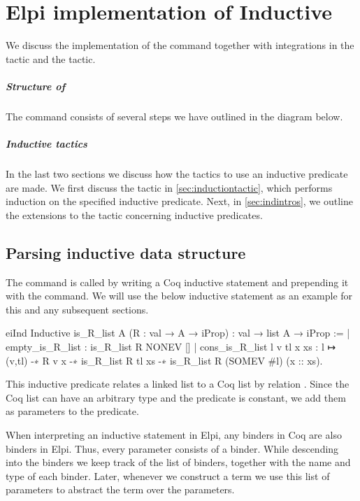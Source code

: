 \documentclass[thesis.tex]{subfiles}
\begin{document}
\chapter{Elpi implementation of Inductive}\label{ch:inductiveimpl}
We discuss the implementation of the  command together with integrations in the  tactic and the  tactic.

\paragraph{Structure of }
The  command consists of several steps we have outlined in the diagram below.

\paragraph{Inductive tactics}
In the last two sections we discuss how the tactics to use an inductive predicate are made. We first discuss the  tactic in \cref{sec:inductiontactic}, which performs induction on the specified inductive predicate. Next, in \cref{sec:indintros}, we outline the extensions to the  tactic concerning inductive predicates.

\section{Parsing inductive data structure}
The  command is called by writing a Coq inductive statement and prepending it with the  command. We will use the below inductive statement as an example for this and any subsequent sections.
\begin{coqcode}
  eiInd
  Inductive is_R_list {A} (R : val → A → iProp) : 
                      val → list A → iProp :=
    | empty_is_R_list : is_R_list R NONEV []
    | cons_is_R_list l v tl x xs : 
        l ↦ (v,tl) -∗ R v x -∗ is_R_list R tl xs -∗ 
        is_R_list R (SOMEV #l) (x :: xs).
\end{coqcode}
This inductive predicate relates a linked list to a Coq list by relation . Since the Coq list can have an arbitrary type  and the predicate  is constant, we add them as parameters to the predicate.

When interpreting an inductive statement in Elpi, any binders in Coq are also binders in Elpi. Thus, every parameter consists of a binder. While descending into the binders we keep track of the list of binders, together with the name and type of each binder. Later, whenever we construct a term we use this list of parameters to abstract the term over the parameters.
\end{document}
